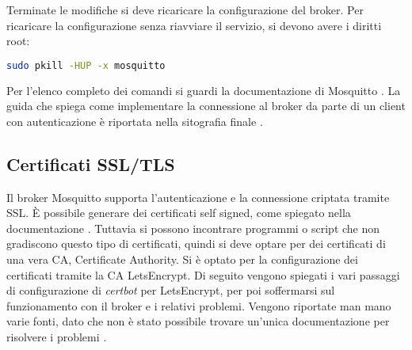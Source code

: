 Terminate le modifiche si deve ricaricare la configurazione del broker.
Per ricaricare la configurazione senza riavviare il servizio, si devono avere i diritti root:
\begin{lstlisting}[language=bash]
sudo pkill -HUP -x mosquitto
\end{lstlisting}
Per l'elenco completo dei comandi si guardi la documentazione di Mosquitto \cite{mosquitto-password}.
La guida che spiega come implementare la connessione al broker da parte di un client con autenticazione
è riportata nella sitografia finale \cite{mosquitto-password-1}.


\subsection{Certificati SSL/TLS}
\label{sec:broker-ssl-tls}
Il broker Mosquitto supporta l'autenticazione e la connessione criptata tramite SSL.\newline
È possibile generare dei certificati self signed, come spiegato nella documentazione \cite{mosquitto-ssl}.
Tuttavia si possono incontrare programmi o script che non gradiscono questo tipo di certificati, quindi
si deve optare per dei certificati di una vera CA, Certificate Authority.\newline
Si è optato per la configurazione dei certificati tramite la CA LetsEncrypt. Di seguito vengono spiegati
i vari passaggi di configurazione di \textit{certbot} per LetsEncrypt, per poi soffermarsi sul funzionamento
con il broker e i relativi problemi.\newline
Vengono riportate man mano varie fonti, dato che non è stato possibile trovare un'unica documentazione per risolvere
i problemi \cite{mosquitto-ssl-1} \cite{mosquitto-ssl-2} \cite{mosquitto-ssl-3}.

